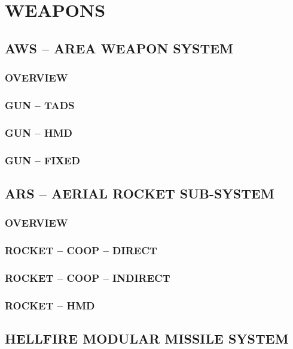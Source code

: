 \documentclass[fontHelvetica]{TechCheck}
\begin{document}
	\cleardoublepage

	\chapter{WEAPONS}
	\minitoc
	\cleardoublepage

	\section{AWS -- AREA WEAPON SYSTEM}
	\subsection{OVERVIEW}
	\subsection{GUN -- TADS}
	\subsection{GUN -- HMD} 
	\subsection{GUN -- FIXED}

	\clearpage 

	\section{ARS -- AERIAL ROCKET SUB-SYSTEM}
	\subsection{OVERVIEW}
	\subsection{ROCKET -- COOP -- DIRECT}
	\subsection{ROCKET -- COOP -- INDIRECT}
	\subsection{ROCKET -- HMD}

	\clearpage

	\section{HELLFIRE MODULAR MISSILE SYSTEM}
\end{document}
